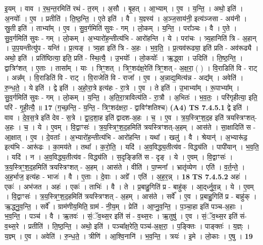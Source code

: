 \documentclass[17pt]{extarticle}
\begin{document}
                  इ॒यम् । वाव । र॒थ॒न्त॒रमिति॑ रथं - त॒रम् । अ॒सौ । बृ॒हत् । आ॒भ्याम् । ए॒व । य॒न्ति॒ । अथो॒ इति॑ । अ॒नयोः᳚ । ए॒व । प्रतीति॑ । ति॒ष्ठ॒न्ति॒ । ए॒ते इति॑ । वै । य॒ज्ञ्स्य॑ । अ॒ञ्ज॒साय॑नी॒ इत्य॑ञ्जसा - अय॑नी । स्रु॒ती इति॑ । ताभ्या᳚म् । ए॒व । सु॒व॒र्गमिति॑ सुवः - गम् । लो॒कम् । य॒न्ति॒ । परा᳚ञ्चः । वै । ए॒ते । सु॒व॒र्गमिति॑ सुवः - गम् । लो॒कम् । अ॒भ्यारो॑ह॒न्तीत्य॑भि - आरो॑हन्ति । ये । परा॑चः । त्र्य॒हानिति॑ त्रि - अ॒हान् । उ॒प॒यन्तीत्यु॑प - यन्ति॑ । प्र॒त्यङ् । त्र्य॒हा इति॑ त्रि - अ॒हः । भ॒व॒ति॒ । प्र॒त्यव॑रूढ्या॒ इति॑ प्रति - अव॑रूढ्यै । अथो॒ इति॑ । प्रति॑ष्ठित्या॒ इति॒ प्रति॑ - स्थि॒त्यै॒ । उ॒भयोः᳚ । लो॒कयोः᳚ । ऋ॒द्ध्वा । उदिति॑ । ति॒ष्ठ॒न्ति॒ । द्वात्रिꣳ॑शत् । ए॒ताः । तासा᳚म् । याः । त्रिꣳ॒॒शत् । त्रिꣳ॒॒शद॑क्ष॒रेति॑ त्रिꣳ॒॒शत् - अ॒क्ष॒रा॒ ( ) । वि॒राडिति॑ वि - राट् । अन्न᳚म् । वि॒राडिति॑ वि - राट् । वि॒राजेति॑ वि - राजा᳚ । ए॒व । अ॒न्नाद्य॒मित्य॑न्न - अद्य᳚म् । अवेति॑ । रु॒न्ध॒ते॒ । ये इति॑ । द्वे इति॑ । अ॒हो॒रा॒त्रे इत्य॑हः - रा॒त्रे । ए॒व । ते इति॑ । उ॒भाभ्या᳚म् । रू॒पाभ्या᳚म् । सु॒व॒र्गमिति॑ सुवः - गम् । लो॒कम् । य॒न्ति॒ । अ॒ति॒रा॒त्रावित्य॑ति - रा॒त्रौ । अ॒भितः॑ । भ॒व॒तः॒ । परि॑गृहीत्या॒ इति॒ परि॑ - गृ॒ही॒त्यै॒ ॥ \textbf{  17} \newline
                  \newline
                      (ग॒च्छ॒न्ति॒ - य॒न्ति॒ - त्रिꣳ॒॒शद॑क्षरा॒ - द्वाविꣳ॑शतिश्च)  \textbf{(A4)} \newline \newline
                                \textbf{ TS 7.4.5.1} \newline
                  द्वे इति॑ । वाव । दे॒व॒स॒त्रे इति॑ देव - स॒त्रे । द्वा॒द॒शा॒ह इति॑ द्वादश-अ॒हः । च॒ । ए॒व । त्र॒य॒स्त्रिꣳ॒॒श॒द॒ह इति॑ त्रयस्त्रिꣳशत्-अ॒हः । च॒ । ये । ए॒वम् । वि॒द्वाꣳसः॑ । त्र॒य॒स्त्रिꣳ॒॒श॒द॒हमिति॑ त्रयस्त्रिꣳशत्-अ॒हम् । आस॑ते । सा॒क्षादिति॑ स - आ॒क्षात् । ए॒व । दे॒वताः᳚ । अ॒भ्यारो॑ह॒न्तीत्य॑भि - आरो॑हन्ति । यथा᳚ । खलु॑ । वै । श्रेयान्॑ । अ॒भ्यारू॑ढ॒ इत्य॑भि - आरू॑ढः । का॒मय॑ते । तथा᳚ । क॒रो॒ति॒ । यदि॑ । अ॒व॒विद्ध्य॒तीत्य॑व - विद्ध्य॑ति । पापी॑यान् । भ॒व॒ति॒ । यदि॑ । न । अ॒व॒विद्ध्य॒तीत्य॑व - विद्ध्य॑ति । स॒दृङ्ङिति॑ स - दृङ् । ये । ए॒वम् । वि॒द्वाꣳसः॑ । त्र॒य॒स्त्रिꣳ॒॒श॒द॒हमिति॑ त्रयस्त्रिꣳशत् - अ॒हम् । आस॑ते । वीति॑ । पा॒प्मना᳚ । भ्रातृ॑व्येण । एति॑ । व॒र्त॒न्ते॒ । अ॒ह॒र्भाज॒ इत्य॑हः - भाजः॑ । वै । ए॒ताः । दे॒वाः । अग्रे᳚ । एति॑ । अ॒ह॒र॒न्न् । \textbf{  18} \newline
                  \newline
                                \textbf{ TS 7.4.5.2} \newline
                  अहः॑ । एकः॑ । अभ॑जत । अहः॑ । एकः॑ । ताभिः॑ । वै । ते । प्र॒बाहु॒गिति॑ प्र - बाहु॑क् । आ॒द्‌र्ध्नु॒व॒न्न् । ये । ए॒वम् । वि॒द्वाꣳसः॑ । त्र॒य॒स्त्रिꣳ॒॒श॒द॒हमिति॑ त्रयस्त्रिꣳशत् - अ॒हम् । आस॑ते । सर्वे᳚ । ए॒व । प्र॒बाहु॒गिति॑ प्र - बाहु॑क् । ऋ॒द्ध्नु॒व॒न्ति॒ । सर्वे᳚ । ग्राम॑णीय॒मिति॒ ग्राम॑ - नी॒य॒म् । प्रेति॑ । आ॒प्नु॒व॒न्ति॒ । प॒ञ्चा॒हा इति॑ पञ्च-अ॒हाः । भ॒व॒न्ति॒ । पञ्च॑ । वै । ऋ॒तवः॑ । सं॒ॅव॒थ्स॒र इति॑ सं - व॒थ्स॒रः । ऋ॒तुषु॑ । ए॒व । सं॒ॅव॒थ्स॒र इति॑ सं-व॒थ्स॒रे । प्रतीति॑ । ति॒ष्ठ॒न्ति॒ । अथो॒ इति॑ । पञ्चा᳚क्ष॒रेति॒ पञ्च॑-अ॒क्ष॒रा॒ । प॒ङ्क्तिः । पाङ्क्तः॑ । य॒ज्ञ्ः । य॒ज्ञ्म् । ए॒व । अवेति॑ । रु॒न्ध॒ते॒ । त्रीणि॑ । आ॒श्वि॒नानि॑ । भ॒व॒न्ति॒ । त्रयः॑ । इ॒मे । लो॒काः । ए॒षु । \textbf{  19} \newline
\end{document}
